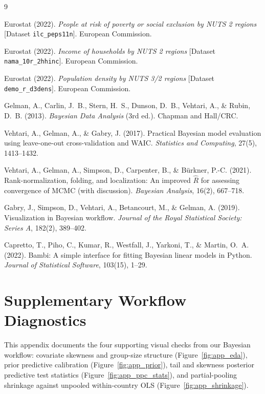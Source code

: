 \documentclass[11pt,a4paper]{article}
\begin{document}
\begin{thebibliography}{9}

Eurostat (2022). \emph{People at risk of poverty or social exclusion by NUTS 2 regions} [Dataset \texttt{ilc\_peps11n}]. European Commission.

Eurostat (2022). \emph{Income of households by NUTS 2 regions} [Dataset \texttt{nama\_10r\_2hhinc}]. European Commission.

Eurostat (2022). \emph{Population density by NUTS 3/2 regions} [Dataset \texttt{demo\_r\_d3dens}]. European Commission.

Gelman, A., Carlin, J.~B., Stern, H.~S., Dunson, D.~B., Vehtari, A., \& Rubin, D.~B. (2013). \emph{Bayesian Data Analysis} (3rd ed.). Chapman and Hall/CRC.

Vehtari, A., Gelman, A., \& Gabry, J. (2017). Practical Bayesian model evaluation using leave-one-out cross-validation and WAIC. \emph{Statistics and Computing}, 27(5), 1413--1432.

Vehtari, A., Gelman, A., Simpson, D., Carpenter, B., \& B\"{u}rkner, P.-C. (2021). Rank-normalization, folding, and localization: An improved $\hat{R}$ for assessing convergence of MCMC (with discussion). \emph{Bayesian Analysis}, 16(2), 667--718.

Gabry, J., Simpson, D., Vehtari, A., Betancourt, M., \& Gelman, A. (2019). Visualization in Bayesian workflow. \emph{Journal of the Royal Statistical Society: Series A}, 182(2), 389--402.

Capretto, T., Piho, C., Kumar, R., Westfall, J., Yarkoni, T., \& Martin, O.~A. (2022). Bambi: A simple interface for fitting Bayesian linear models in Python. \emph{Journal of Statistical Software}, 103(15), 1--29.

\end{thebibliography}

\clearpage
\appendix
\section{Supplementary Workflow Diagnostics}
\setcounter{figure}{0}
\renewcommand{\thefigure}{A.\arabic{figure}}

This appendix documents the four supporting visual checks from our Bayesian workflow: covariate skewness and group-size structure (Figure~\ref{fig:app_eda}), prior predictive calibration (Figure~\ref{fig:app_prior}), tail and skewness posterior predictive test statistics (Figure~\ref{fig:app_ppc_stats}), and partial-pooling shrinkage against unpooled within-country OLS (Figure~\ref{fig:app_shrinkage}).
\end{document}
